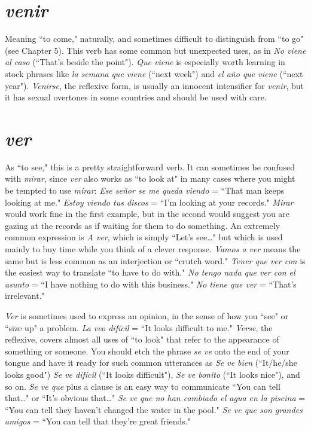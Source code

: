 \section{\emph{venir}}

Meaning ``to come," naturally, and sometimes difficult to distinguish from ``to go" (see Chapter 5). This verb has some common
but unexpected uses, as in \emph{No viene al caso} (``That's beside the point").
\emph{Que viene} is especially worth learning in stock phrases like \emph{la semana
	que viene} (``next week") and \emph{el año que viene} (``next year"). \emph{Venirse},
the reflexive form, is usually an innocent intensifier for \emph{venir}, but it
has sexual overtones in some countries and should be used with care.

\section{\emph{ver}}

As ``to see," this is a pretty straightforward verb. It can sometimes be confused with \emph{mirar}, since \emph{ver} also works as ``to look at" in
many cases where you might be tempted to use \emph{mirar}: \emph{Ese señor se me
	queda viendo} = ``That man keeps looking at me." \emph{Estoy viendo tus
	discos} = ``I'm looking at your records." \emph{Mirar} would work fine in the
first example, but in the second would suggest you are gazing at the
records as if waiting for them to do something. An extremely common
expression is \emph{A ver}, which is simply ``Let's see\ldots{}" but which is used
mainly to buy time while you think of a clever response. \emph{Vamos a
	ver} means the same but is less common as an interjection or ``crutch
word." \emph{Tener que ver con} is the easiest way to translate ``to have to do
with." \emph{No tengo nada que ver con el asunto} = ``I have nothing to do
with this business." \emph{No tiene que ver} = ``That's irrelevant."

\emph{Ver} is sometimes used to express an opinion, in the sense of
how you ``see" or ``size up" a problem. \emph{La veo difícil} = ``It looks difficult to me." \emph{Verse}, the reflexive, covers almost all uses of ``to look"
that refer to the appearance of something or someone. You should etch
the phrase \emph{se ve} onto the end of your tongue and have it ready for such
common utterances as \emph{Se ve bien} (``It/he/she looks good") \emph{Se ve difícil}
(``It looks difficult"), \emph{Se ve bonito} (``It looks nice"), and so on. \emph{Se ve que}
plus a clause is an easy way to communicate ``You can tell that\ldots{}" or
``It's obvious that\ldots{}" \emph{Se ve que no han cambiado el agua en la piscina} = ``You can tell they haven't changed the water in the pool." \emph{Se
	ve que son grandes amigos} = ``You can tell that they're great friends."

